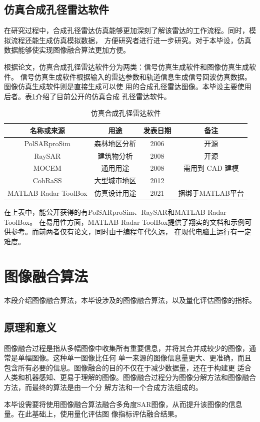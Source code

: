 \documentclass{xduugthesis}
\begin{document}
\subsection{仿真合成孔径雷达软件}
在研究过程中，合成孔径雷达仿真能够更加深刻了解该雷达的工作流程。同时，模拟流程还能生成仿真模拟数据，
方便研究者进行进一步研究。对于本毕设，仿真数据能够使实现图像融合算法更加方便。\par
根据论文\parencite{Simulator}，仿真合成孔径雷达软件分为两类：信号仿真生成软件和图像仿真生成软件。
信号仿真生成软件根据输入的雷达参数和轨道信息生成信号回波仿真数据。图像仿真生成软件则是直接生成可以使
用的合成孔径雷达图像。本毕设主要使用后者。表\ref{Simulation_Software}介绍了目前公开的仿真合成
孔径雷达软件。\par
\begin{table}[!htb]
	\begin{center}
		\caption{仿真合成孔径雷达软件}\label{Simulation_Software}
		\begin{tabular}{|c|c|c|c|}
			\hline
			\textbf{名称或来源} & \textbf{用途} & \textbf{发表日期} & \textbf{备注} \\
			\hline
			PolSARproSim\parencite{PolSAR} & 森林地区分析 & 2006 & 开源 \\
			\hline
			RaySAR\parencite{RaySAR} & 建筑物分析 & 2008 & 开源 \\
			\hline
			MOCEM\parencite{MOCEM} & 通用用途 & 2008 & 需用到 CAD 建模 \\
			\hline
			CohRaSS\parencite{CohRaSS} & 大型城市地区 & 2012 &   \\
			\hline
			MATLAB Radar ToolBox\parencite{MatlabRadar} & 仿真设计用途 & 2021 & 捆绑于MATLAB平台 \\
			\hline
		\end{tabular}
	\end{center}
\end{table}
\vspace{-1em} 
在上表中，能公开获得的有PolSARproSim\cite{PolSAR}、RaySAR\cite{RaySAR}和MATLAB Radar ToolBox\cite{MatlabRadar}。
在易用性方面，MATLAB Radar ToolBox\cite{MatlabRadar}提供了翔实的文档和示例可供参考。而前两者仅有论文，同时由于编程年代久远，
在现代电脑上运行有一定难度。
\section{图像融合算法}
本段介绍图像融合算法，本毕设涉及的图像融合算法，以及量化评估图像的指标。
\subsection{原理和意义}
图像融合过程\cite{Fusion_Way}是指从多幅图像中收集所有重要信息，并将其合并成较少的图像，通常是单幅图像。这种单一图像比任何
单一来源的图像信息量更大、更准确，而且包含所有必要的信息。图像融合的目的不仅在于减少数据量，还在于构建更
适合人类和机器感知、更易于理解的图像。图像融合过程分为图像分解方法和图像融合方法，而最终的算法是由一个分
解方法和一个合成方法组成的。\par
本毕设需要将使用图像融合算法融合多角度SAR图像，从而提升该图像的信息量。在此基础上，使用量化评估图
像指标评估融合结果。
\end{document}
